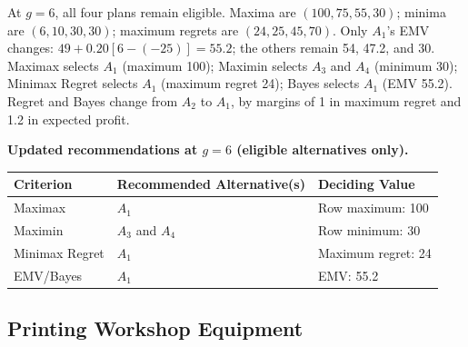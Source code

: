 \begin{enumerate}
At $g=6$, all four plans remain eligible. Maxima are $(100,75,55,30)$; minima are $(6,10,30,30)$; maximum regrets are $(24,25,45,70)$. Only $A_1$'s EMV changes: $49+0.20[6-(-25)]=55.2$; the others remain 54, 47.2, and 30. Maximax selects $A_1$ (maximum 100); Maximin selects $A_3$ and $A_4$ (minimum 30); Minimax Regret selects $A_1$ (maximum regret 24); Bayes selects $A_1$ (EMV 55.2). Regret and Bayes change from $A_2$ to $A_1$, by margins of 1 in maximum regret and 1.2 in expected profit.

\textbf{Updated recommendations at $g=6$ (eligible alternatives only).}
\begin{center}
\begin{tabular}{lll}\toprule
Criterion & Recommended Alternative(s) & Deciding Value\\\midrule
Maximax & $A_1$ & Row maximum: 100\\
Maximin & $A_3$ and $A_4$ & Row minimum: 30\\
Minimax Regret & $A_1$ & Maximum regret: 24\\
EMV/Bayes & $A_1$ & EMV: 55.2\\\bottomrule
\end{tabular}
\end{center}
\end{enumerate}

\subsection{Printing Workshop Equipment}\label{sec:c8-printing}
